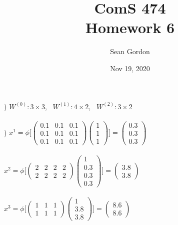 \documentclass[12pt]{article}
\title{ComS 474\\Homework 6}
\author{Sean Gordon}
\date{Nov 19, 2020}
\begin{document}
\maketitle



) $W^{(0)}: 3\times3$, \ $W^{(1)}: 4\times2$, \ $W^{(2)}: 3\times2$\\



\noindent \hrulefill \\



) $x^1 = \phi\Bigg[
\begin{pmatrix}
0.1 & 0.1 & 0.1\\
0.1 & 0.1 & 0.1\\
0.1 & 0.1 & 0.1
\end{pmatrix}
\begin{pmatrix}
1\\ 1\\ 1
\end{pmatrix}\Bigg]=
\begin{pmatrix}
0.3\\ 0.3\\ 0.3
\end{pmatrix}$\\\\

\indent $x^2 = \phi\Bigg[
\begin{pmatrix}
2 & 2 & 2 & 2\\
2 & 2 & 2 & 2
\end{pmatrix}
\begin{pmatrix}
1\\ 0.3\\ 0.3 \\ 0.3
\end{pmatrix}\Bigg]=
\begin{pmatrix}
3.8\\ 3.8
\end{pmatrix}$\\\\

\indent $x^3 = \phi\Bigg[
\begin{pmatrix}
1 & 1 & 1\\
1 & 1 & 1
\end{pmatrix}
\begin{pmatrix}
1\\ 3.8\\ 3.8
\end{pmatrix}\Bigg]=
\begin{pmatrix}
8.6 \\ 8.6
\end{pmatrix}$\\\\
\end{document}
